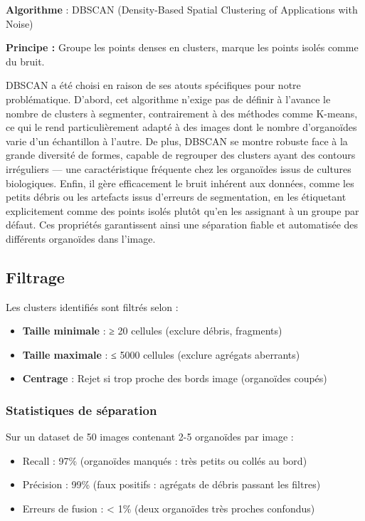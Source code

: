 \textbf{Algorithme} : DBSCAN (Density-Based Spatial Clustering of Applications with Noise)

\textbf{Principe :}
Groupe les points denses en clusters, marque les points isolés comme du bruit.

DBSCAN a été choisi en raison de ses atouts spécifiques pour notre problématique. D'abord, cet algorithme n'exige pas de définir à l'avance le nombre de clusters à segmenter, contrairement à des méthodes comme K-means, ce qui le rend particulièrement adapté à des images dont le nombre d'organoïdes varie d'un échantillon à l'autre. De plus, DBSCAN se montre robuste face à la grande diversité de formes, capable de regrouper des clusters ayant des contours irréguliers — une caractéristique fréquente chez les organoïdes issus de cultures biologiques. Enfin, il gère efficacement le bruit inhérent aux données, comme les petits débris ou les artefacts issus d'erreurs de segmentation, en les étiquetant explicitement comme des points isolés plutôt qu’en les assignant à un groupe par défaut. Ces propriétés garantissent ainsi une séparation fiable et automatisée des différents organoïdes dans l'image.

\subsection{Filtrage}

Les clusters identifiés sont filtrés selon :
\begin{itemize}
    \item \textbf{Taille minimale} : ≥ 20 cellules (exclure débris, fragments)
    \item \textbf{Taille maximale} : ≤ 5000 cellules (exclure agrégats aberrants)
    \item \textbf{Centrage} : Rejet si trop proche des bords image (organoïdes coupés)
\end{itemize}

\subsubsection{Statistiques de séparation}

Sur un dataset de 50 images contenant 2-5 organoïdes par image :
\begin{itemize}
    \item Recall : 97\% (organoïdes manqués : très petits ou collés au bord)
    \item Précision : 99\% (faux positifs : agrégats de débris passant les filtres)
    \item Erreurs de fusion : < 1\% (deux organoïdes très proches confondus)
\end{itemize}

